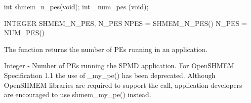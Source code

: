 
\synC
	  int shmem_n_pes(void);
	  int _num_pes (void);

\synF
	  INTEGER SHMEM_N_PES, N_PES
	  NPES = SHMEM_N_PES()
	  N_PES = NUM_PES()



{
	The  function  returns	the  number  of	 PEs  running  in   an
	application.
}

{
		\desTB{}
		{
				\cRow{}{}
		}
		{Integer -  Number  of  PEs  running the SPMD application.}
}
{
		For OpenSHMEM Specification 1.1 the use of \_my\_pe() has been deprecated. Although OpenSHMEM libraries are required to support the call, application developers are encouraged to use shmem\_my\_pe() instead.
}

\eAPI

